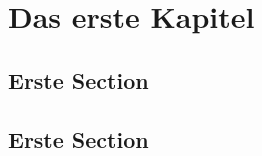 \documentclass[draft]{tubsbook}
\begin{document}
\chapter{Das erste Kapitel}\cleardoublepage
\lipsum[1-6]
\section{Erste Section}
\lipsum[1-6]
\section{Erste Section}
\lipsum[1-6]
\end{document}
